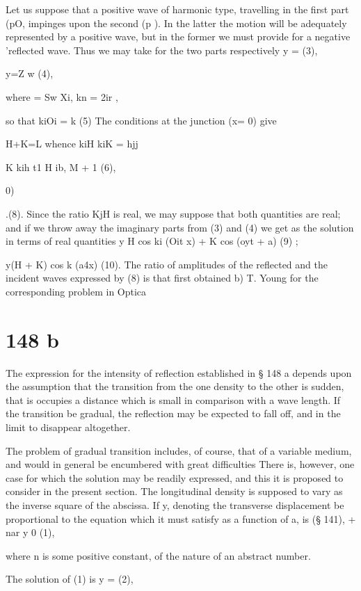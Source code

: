 Let us suppose that a positive wave of harmonic type, travelling in the
first part (pO, impinges upon the second (p ). In the latter the motion
will be adequately represented by a positive wave, but in the former we
must provide for a negative 'reflected wave. Thus we may take for the
two parts respectively y = (3),

y=Z w (4),

where = Sw Xi, kn = 2ir ,

so that kiOi = k (5) The conditions at the junction (x= 0) give

H+K=L whence kiH  kiK = hjj

K kih t1 H ib, M + 1 (6),

0)

.(8). Since the ratio KjH is real, we may suppose that both quantities
are real; and if we throw away the imaginary parts from (3) and (4) we
get as the solution in terms of real quantities y H cos ki (Oit x) + K
cos (oyt + a) (9) ;

y(H + K) cos k (a4x) (10). The ratio of amplitudes of the reflected and
the incident waves expressed by (8) is that first obtained b) T. Young
for the corresponding problem in Optica

\section{148 b}\label{sect:148b}

The expression for the intensity of reflection established in § 148 a
depends upon the assumption that the transition from the one density to
the other is sudden, that is occupies a distance which is small in
comparison with a wave length. If the transition be gradual, the
reflection may be expected to fall off, and in the limit to disappear
altogether.

The problem of gradual transition includes, of course, that of a
variable medium, and would in general be encumbered with great
difficulties There is, however, one case for which the solution may be
readily expressed, and this it is proposed to consider in the present
section. The longitudinal density is supposed to vary as the inverse
square of the abscissa. If y, denoting the transverse displacement be
proportional to the equation which it must satisfy as a function of a,
is (§ 141), + nar y 0 (1),

where n is some positive constant, of the nature of an abstract number.

The solution of (1) is y = (2),

